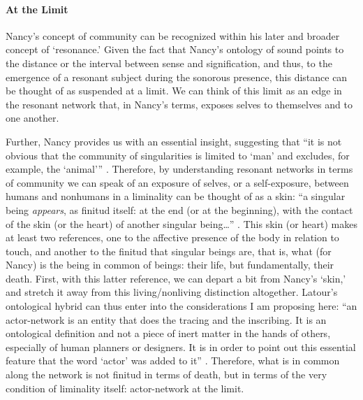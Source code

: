 \paragraph{At the Limit}
Nancy's concept of community can be recognized within his later and broader concept of `resonance.' Given the fact that Nancy's ontology of sound points to the distance or the interval between sense and signification, and thus, to the emergence of a resonant subject during the sonorous presence, this distance can be thought of as suspended at a limit. We can think of this limit as an edge in the resonant network that, in Nancy's terms, exposes selves to themselves and to one another. 


Further, Nancy provides us with an essential insight, suggesting that ``it is not obvious that the community of singularities is limited to `man' and excludes, for example, the `animal''' \parencite[28]{Nan91:The}. Therefore, by understanding resonant networks in terms of community we can speak of an exposure of selves, or a self-exposure, between humans and nonhumans in a liminality can be thought of as a skin: ``a singular being \textit{appears}, as finitud itself: at the end (or at the beginning), with the contact of the skin (or the heart) of another singular being\dots'' \parencite[28]{Nan91:The}. This skin (or heart) makes at least two references, one to the affective presence of the body in relation to touch, and another to the finitud that singular beings are, that is, what (for Nancy) is the being in common of beings: their life, but fundamentally, their death. First, with this latter reference, we can depart a bit from Nancy's `skin,' and stretch it away from this living/nonliving distinction altogether. Latour's ontological hybrid can thus enter into the considerations I am proposing here: ``an actor-network is an entity that does the tracing and the inscribing. It is an ontological definition and not a piece of inert matter in the hands of others, especially of human planners or designers. It is in order to point out this essential feature that the word `actor' was added to it'' \parencite[7]{Lat90:On}. Therefore, what is in common along the network is not finitud in terms of death, but in terms of the very condition of liminality itself: actor-network at the limit.

